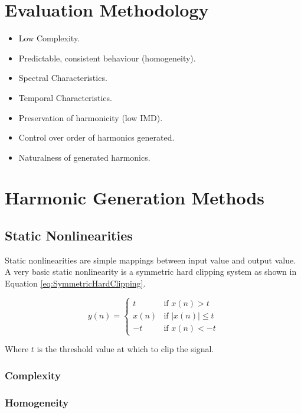 \section{Evaluation Methodology}
\label{sec:Excitation-Evaluation}
	\begin{itemize}
		\item Low Complexity.
		\item Predictable, consistent behaviour (homogeneity).
		\item Spectral Characteristics.
		\item Temporal Characteristics.
		\item Preservation of harmonicity (low IMD).
		\item Control over order of harmonics generated.
		\item Naturalness of generated harmonics.
	\end{itemize}

\section{Harmonic Generation Methods}
\label{sec:Excitation-Methods}

	\subsection{Static Nonlinearities}
	\label{sec:Excitation-Statics}
		Static nonlinearities are simple mappings between input value and output value. A very basic static
		nonlinearity is a symmetric hard clipping system as shown in Equation \ref{eq:SymmetricHardClipping}.

		\begin{equation}
			y(n) = \begin{cases}
				t & \text{if $x(n) > t$} \\
				x(n) & \text{if $|x(n)| \leq t$} \\
				-t & \text{if $x(n) < -t$}
			\end{cases}
			\label{eq:SymmetricHardClipping}
		\end{equation}

		Where $t$ is the threshold value at which to clip the signal. 

		\subsubsection*{Complexity}

		\subsubsection*{Homogeneity}

